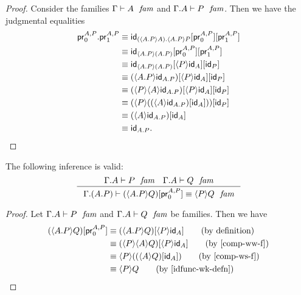 \begin{proof}
Consider the families $\jfam{\Gamma}{A}$ and $\jfam{{\Gamma}{A}}{P}$. Then
we have the judgmental equalities
\begin{align*}
\ctxext{\cprojfstf{A}{P}}{\cprojsndf{A}{P}}
& \jdeq \subst{\cprojsndf{A}{P}}{{\cprojfstf{A}{P}}{\idfunc[\ctxext{\ctxwk{\ctxext{A}{P}}{A}}{\ctxwk{\ctxext{A}{P}}{P}}]}}\\
& \jdeq \subst
          {\cprojsndf{A}{P}}
          { {\cprojfstf{A}{P}}
            {\idfunc[\ctxwk{\ctxext{A}{P}}{\ctxext{A}{P}}]}}\\
& \jdeq \subst
          {\idfunc[P]}
          { {\ctxwk{P}{\idfunc[A]}}
            {\idfunc[\ctxwk{\ctxext{A}{P}}{\ctxext{A}{P}}]}}\\
& \jdeq \subst
          {\idfunc[P]}
          { {\ctxwk{P}{\idfunc[A]}}
            {\ctxwk{\ctxext{A}{P}}{\idfunc[\ctxext{A}{P}]}}}\\
& \jdeq \subst
          {\idfunc[P]}
          { {\ctxwk{P}{\idfunc[A]}}
            {\ctxwk{P}{{A}{\idfunc[\ctxext{A}{P}]}}}}\\
& \jdeq \subst
          {\idfunc[P]}
          {\ctxwk
            {P}
            {\subst
              {\idfunc[A]}
              {\ctxwk{A}{\idfunc[\ctxext{A}{P}]}}}}\\
& \jdeq \subst
          {\idfunc[A]}
          {\ctxwk{A}{\idfunc[\ctxext{A}{P}]}}\\
& \jdeq \idfunc[\ctxext{A}{P}].
\end{align*}
\end{proof}

\begin{lem}
The following inference is valid:
\begin{equation*}
\inference
  {\jfam{{\Gamma}{A}}{P}
   \jfam{{\Gamma}{A}}{Q}}
  {\jfameq{{\Gamma}{{A}{P}}}{\subst{\cprojfstf{A}{P}}{\ctxwk{\ctxext{A}{P}}{Q}}}{\ctxwk{P}{Q}}}
\end{equation*}
\end{lem}

\begin{proof}
Let $\jfam{{\Gamma}{A}}{P}$ and $\jfam{{\Gamma}{A}}{Q}$ be
families. Then we have
\begin{align*}
\subst{\cprojfstf{A}{P}}{\ctxwk{\ctxext{A}{P}}{Q}} 
& \jdeq \subst{\ctxwk{P}{\idfunc[A]}}{\ctxwk{\ctxext{A}{P}}{Q}} \tag{by definition}\\
& \jdeq \subst{\ctxwk{P}{\idfunc[A]}}{\ctxwk{P}{{A}{Q}}} \tag{by \autoref{comp-ww-f}}\\
& \jdeq \ctxwk{P}{\subst{\idfunc[A]}{\ctxwk{A}{Q}}} \tag{by \autoref{comp-ws-f}}\\
& \jdeq \ctxwk{P}{Q} \tag{by \autoref{idfunc-wk-defn}}
\end{align*}
\end{proof}

